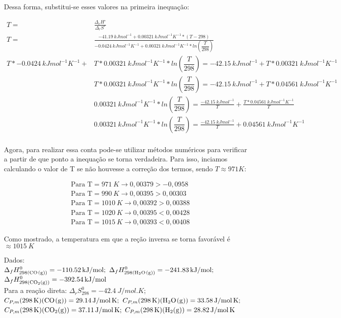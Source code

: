 Dessa forma, substitui-se esses valores na primeira inequação:

\begin{align*}
	T = &\frac{\Delta_rH^\circ}{\Delta_rS^\circ}\\ 
	T = &\frac{\qty{-41,19}{kJmol^{-1}} +\qty{0,00321}{kJmol^{-1}K^{-1}} *  (T - 298)}{\qty{-0,0424}{kJmol^{-1}K^{-1}} +\qty{0,00321}{kJmol^{-1}K^{-1}} * ln (\dfrac{T}{298})} \\  
	T * \qty{-0,0424}{kJmol^{-1}K^{-1}} + &T * \qty{0,00321}{kJmol^{-1}K^{-1}} *  ln (\dfrac{T}{298}) = \qty{-42,15}{kJmol^{-1}} + T * \qty{0,00321}{kJmol^{-1}K^{-1}} \\
	   &T * \qty{0,00321}{kJmol^{-1}K^{-1}} *  ln (\dfrac{T}{298}) = \qty{-42,15}{kJmol^{-1}} + T * \qty{0,04561}{kJmol^{-1}K^{-1}}\\
	&   \qty{0,00321}{kJmol^{-1}K^{-1}} * ln (\dfrac{T}{298}) = \frac{\qty{-42,15}{kJmol^{-1}}}{T}  + \frac{T * \qty{0,04561}{kJmol^{-1}K^{-1}}}{T} \\
	&   \qty{0,00321}{kJmol^{-1}K^{-1}} * ln (\dfrac{T}{298}) = \frac{\qty{-42,15}{kJmol^{-1}}}{T}  + \qty{0,04561}{kJmol^{-1}K^{-1}} \\
\end{align*}

 Agora, para realizar essa conta pode-se utilizar métodos numéricos para
 verificar a partir de que ponto a inequação se torna verdadeira. Para
 isso, inciamos calculando o valor de T se não houvesse a correção dos termos, sendo \(T \approx 971 K\):
 
 \begin{align*}
 	&\text{Para T} = \qty{971}{K} \rightarrow 0,00379 > -0,0958 \\
 	&\text{Para T} = \qty{990}{K} \rightarrow 0,00395 > 0,00303 \\
 	&\text{Para T} = \qty{1010}{K} \rightarrow 0,00392 > 0,00388 \\
 	&\text{Para T} = \qty{1020}{K} \rightarrow 0,00395 < 0,00428 \\
 	&\text{Para T} = \qty{1015}{K} \rightarrow 0,00393 < 0,00408 
 \end{align*}
 
 Como mostrado, a temperatura em que a reção inversa se torna favorável é $\approx \qty{1015}{K}$ 
  
\noindent Dados:\\
\( \Delta_f H^0_{298(\ce{CO(g)})} = \qty{-110.52}{kJ \per mol};\) 
\( \Delta_f H^0_{298(\ce{H2O(g)})} = \qty{-241.83}{kJ \per mol};\) 
\( \Delta_f H^0_{298(\ce{CO2(g)})} = \qty{-392.54}{kJ \per mol}\) \\
Para a reação direta: \( \Delta _r S^0_{298} = \qty{-42.4}{J \per mol . K} \);\\
\(C_{P,m} (\qty{298}{K}) (\ce{CO(g)}) = \qty{29.14}{J \per mol . K}; \)
\(C_{P,m} (\qty{298}{K}) (\ce{H2O(g)}) = \qty{33.58}{J \per mol . K}; \)\\
\(C_{P,m} (\qty{298}{K}) (\ce{CO2(g)}) = \qty{37.11}{J \per mol . K}; \)
\(C_{P,m} (\qty{298}{K}) (\ce{H2(g)}) = \qty{28.82}{J \per mol . K} \)
